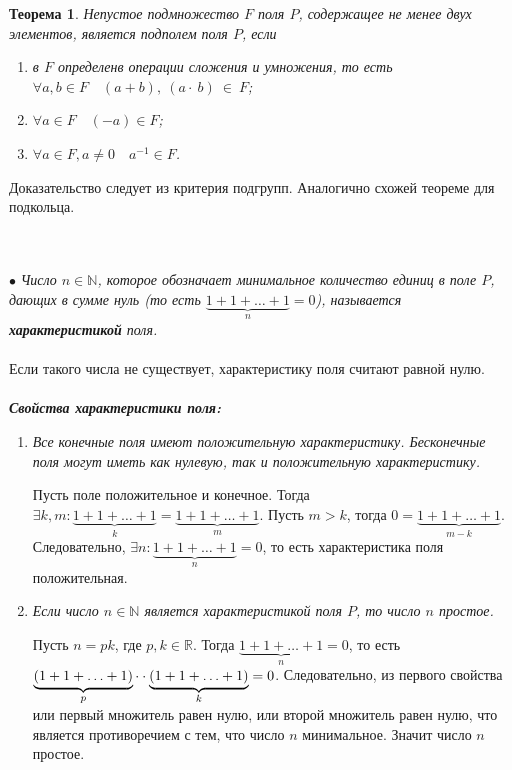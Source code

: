 \newtheorem*{7_6_1}{Теорема}\begin{7_6_1}
	Непустое подмножество $F$ поля $P$, содержащее не менее двух элементов, является подполем поля $P$, если \begin{enumerate}
		\item в $F$ определенв операции сложения и умножения, то есть $\forall a,b \in F\quad (a + b),~(a\cdot~b)~\in~F$;
		\item $\forall a \in F\quad (-a) \in F$;
		\item $\forall a \in F, a\ne 0 \quad a^{-1} \in F$. 
	\end{enumerate}
\end{7_6_1} \begin{Proof}
	Доказательство следует из критерия подгрупп. Аналогично схожей теореме для подкольца.
\end{Proof}\\\\
$\bullet$ \textit{Число $n\in \mathbb{N}$, которое обозначает минимальное количество единиц в поле $P$, дающих в
	сумме нуль (то есть $\underbrace{1 + 1 + \ldots + 1}_{n} = 0$), называется \textbf{характеристикой} поля.}\\\\ Если такого числа не существует,
характеристику поля считают равной нулю.\\\\
\textbf{\textit{Свойства характеристики поля:}}\begin{enumerate}
	\item \textit{Все конечные поля имеют положительную характеристику. Бесконечные поля могут иметь как
		нулевую, так и положительную характеристику.}
	\begin{Proof}
		Пусть поле положительное и конечное. Тогда $\exists k, m : \underbrace{1 + 1 + \ldots + 1}_{k} = \underbrace{1 + 1 + \ldots + 1}_{m}$. Пусть $m > k$, тогда $0 = \underbrace{1 + 1 + \ldots + 1}_{m-k}$. Следовательно, $\exists n : \underbrace{1 + 1 + \ldots + 1}_{n} = 0$, то есть характеристика поля положительная.
	\end{Proof}
	\item \textit{Если число $n\in \mathbb{N}$ является характеристикой поля $P$, то число $n$ простое.}\begin{Proof}
		Пусть $n = pk$, где $p,k \in \mathbb{R}$. Тогда $\underbrace{1+1+\ldots+1}_{n} = 0$, то есть $\underbrace{(1+1+\ldots+1)}_{p}\cdot\\ \cdot \underbrace{(1+1+\ldots+1)}_{k} = 0$. Следовательно, из первого свойства или первый множитель равен нулю, или второй множитель равен нулю, что является противоречием с тем, что число $n$ минимальное. Значит число $n$ простое.
	\end{Proof}
\end{enumerate}


